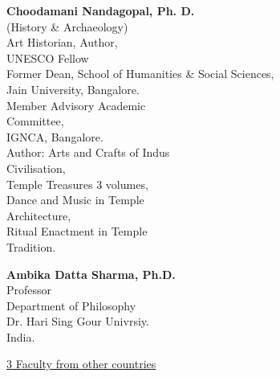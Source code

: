 \begin{multicols}{2}
\begin{trivlist}
\item\textbf{Choodamani Nandagopal, Ph. D.}\\ 
(History \& Archaeology)\\[2pt]
Art Historian, Author,\\[2pt]
UNESCO Fellow\\[2pt]
Former Dean, School of Humanities \& Social Sciences,\\ 
Jain University, Bangalore.\\[2pt]
Member Advisory Academic\\ Committee,\\ 
IGNCA, Bangalore.\\[2pt]
Author: Arts and Crafts of Indus\\ Civilisation,\\ 
Temple Treasures 3 volumes,\\[2pt]
Dance and Music in Temple\\ Architecture,\\ 
Ritual Enactment in Temple\\ Tradition.
 

\item \textbf{Ambika Datta Sharma, Ph.D.}\\ 
Professor\\ 
Department of Philosophy\\
Dr. Hari Sing Gour Univrsiy.\\ 
India.
\end{trivlist}
\end{multicols}
\newpage

\centerline{\underline{3 Faculty from other countries}}

